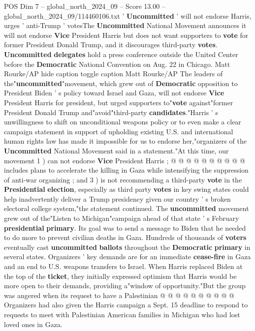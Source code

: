 \begin{textsample}{POS Dim 7 – global\_north\_2024\_09 – Score 13.00 – global\_north\_2024\_09/114460106.txt}  \label{ex:f7_pos_076}
' \textbf{Uncommitted} ' will not endorse Harris, urges ' anti-Trump ' votesThe \textbf{Uncommitted} National Movement announces it will not endorse \textbf{Vice} President Harris but does not want supporters to \textbf{vote} for former President Donald Trump, and it discourages third-party \textbf{votes}. \textbf{Uncommitted} \textbf{delegates} hold a press conference outside the United Center before the \textbf{Democratic} National Convention on Aug. 22 in Chicago.
Matt Rourke/AP hide caption toggle caption Matt Rourke/AP The leaders of the"\textbf{uncommitted}"movement, which grew out of \textbf{Democratic} opposition to President Biden ' s policy toward Israel and Gaza, will not endorse \textbf{Vice} President Harris for president, but urged supporters to"\textbf{vote} against"former President Donald Trump and"avoid"third-party \textbf{candidates}."Harris ' s unwillingness to shift on unconditional weapons policy or to even make a clear campaign statement in support of upholding existing U.S. and international human rights law has made it impossible for us to endorse her,"organizers of the \textbf{Uncommitted} National Movement said in a statement."At this time, our movement 1 ) can not endorse \textbf{Vice} President Harris ; @ @ @ @ @ @ @ @ @ @ includes plans to accelerate the killing in Gaza while intensifying the suppression of anti-war organizing ; and 3 ) is not recommending a third-party \textbf{vote} in the \textbf{Presidential} \textbf{election}, especially as third party \textbf{votes} in key swing states could help inadvertently deliver a Trump presidency given our country ' s broken electoral college system,"the statement continued.
The \textbf{uncommitted} movement grew out of the"Listen to Michigan"campaign ahead of that state ' s February \textbf{presidential} \textbf{primary}.
Its goal was to send a message to Biden that he needed to do more to prevent civilian deaths in Gaza.
Hundreds of thousands of \textbf{voters} eventually cast \textbf{uncommitted} \textbf{ballots} throughout the \textbf{Democratic} \textbf{primary} in several states.
Organizers ' key demands are for an immediate \textbf{cease-fire} in Gaza and an end to U.S. weapons transfers to Israel.
When Harris replaced Biden at the top of the \textbf{ticket}, they initially expressed optimism that Harris would be more open to their demands, providing a"window of opportunity."But the group was angered when its request to have a Palestinian @ @ @ @ @ @ @ @ @ @ Organizers had also given the Harris campaign a Sept. 15 deadline to respond to requests to meet with Palestinian American families in Michigan who had lost loved ones in Gaza.

\end{textsample}

